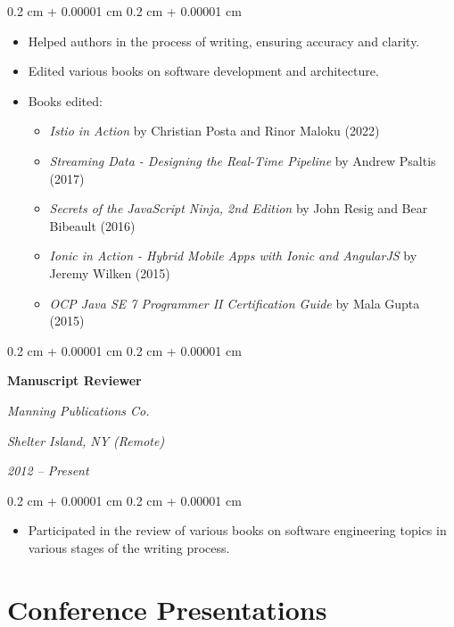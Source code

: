 \documentclass[10pt, a4paper]{article}
\newenvironment{highlights}{
    \begin{itemize}[
        topsep=0.10 cm,
        parsep=0.10 cm,
        partopsep=0pt,
        itemsep=0pt,
        leftmargin=0.4 cm + 10pt
    ]
}{
    \end{itemize}
} %
\newenvironment{onecolentry}{
    \begin{adjustwidth}{
        0.2 cm + 0.00001 cm
    }{
        0.2 cm + 0.00001 cm
    }
}{
    \end{adjustwidth}
} %
\newenvironment{twocolentry}[2][6cm]{ %
    \onecolentry
    \def\secondColumn{#2}
    \setcolumnwidth{\fill, #1} %
    \begin{paracol}{2}
}{
    \switchcolumn \raggedleft \secondColumn
    \end{paracol}
    \endonecolentry
} %
\begin{document}
\vspace{0.10 cm}
\begin{onecolentry}
    \begin{highlights}
        \item Helped authors in the process of writing, ensuring accuracy and clarity.
        \item Edited various books on software development and architecture.
        \item Books edited:
        \begin{itemize}[leftmargin=0.5cm, topsep=0.0cm, itemsep=0.02cm]
            \item \textit{Istio in Action} by Christian Posta and Rinor Maloku (2022)
            \item \textit{Streaming Data - Designing the Real-Time Pipeline} by Andrew Psaltis (2017)
            \item \textit{Secrets of the JavaScript Ninja, 2nd Edition} by John Resig and Bear Bibeault (2016)
            \item \textit{Ionic in Action - Hybrid Mobile Apps with Ionic and AngularJS} by Jeremy Wilken (2015)
            \item \textit{OCP Java SE 7 Programmer II Certification Guide} by Mala Gupta (2015)
        \end{itemize}
    \end{highlights}
\end{onecolentry}

\vspace{0.20 cm}

\begin{twocolentry}{
        \textit{Shelter Island, NY (Remote)}

        \textit{2012 – Present}}
    \textbf{Manuscript Reviewer}

    \textit{Manning Publications Co.}
\end{twocolentry}

\vspace{0.10 cm}
\begin{onecolentry}
    \begin{highlights}
        \item Participated in the review of various books on software engineering topics in various stages of the writing process.
    \end{highlights}
\end{onecolentry}



\section{Conference Presentations}
\end{document}
